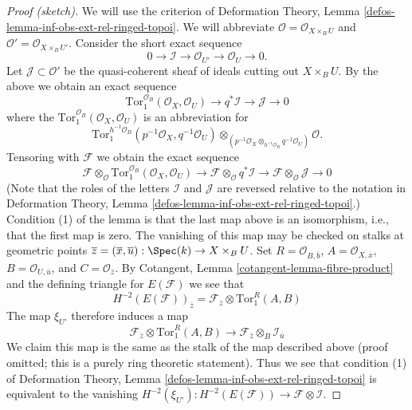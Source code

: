 \begin{proof}[Proof (sketch)]
We will use the criterion of
Deformation Theory, Lemma \ref{defos-lemma-inf-obs-ext-rel-ringed-topoi}.
We will abbreviate $\mathcal{O} = \mathcal{O}_{X \times_B U}$ and
$\mathcal{O}' = \mathcal{O}_{X \times_B U'}$.
Consider the short exact sequence
$$
0 \to \mathcal{I} \to \mathcal{O}_{U'} \to \mathcal{O}_U \to 0.
$$
Let $\mathcal{J} \subset \mathcal{O}'$ be the quasi-coherent
sheaf of ideals cutting out $X \times_B U$. By the above we obtain an exact
sequence
$$
\text{Tor}_1^{\mathcal{O}_B}(\mathcal{O}_X, \mathcal{O}_U) \to
q^*\mathcal{I} \to \mathcal{J} \to 0
$$
where the $\text{Tor}_1^{\mathcal{O}_B}(\mathcal{O}_X, \mathcal{O}_U)$
is an abbreviation for
$$
\text{Tor}_1^{h^{-1}\mathcal{O}_B}(p^{-1}\mathcal{O}_X, q^{-1}\mathcal{O}_U)
\otimes_{(p^{-1}\mathcal{O}_X\otimes_{h^{-1}\mathcal{O}_B}q^{-1}\mathcal{O}_U)}
\mathcal{O}.
$$
Tensoring with $\mathcal{F}$ we obtain the exact sequence
$$
\mathcal{F} \otimes_\mathcal{O}
\text{Tor}_1^{\mathcal{O}_B}(\mathcal{O}_X, \mathcal{O}_U) \to
\mathcal{F} \otimes_\mathcal{O}
q^*\mathcal{I} \to
\mathcal{F} \otimes_\mathcal{O} \mathcal{J} \to 0
$$
(Note that the roles of the letters $\mathcal{I}$ and $\mathcal{J}$
are reversed relative to the notation in
Deformation Theory, Lemma \ref{defos-lemma-inf-obs-ext-rel-ringed-topoi}.)
Condition (1) of the lemma is that the last map above is an
isomorphism, i.e., that the first map is zero.
The vanishing of this map may be checked on stalks at geometric points 
$\overline{z} = (\overline{x}, \overline{u}) : \Spec(k) \to X \times_B U$.
Set $R = \mathcal{O}_{B, \overline{b}}$, $A = \mathcal{O}_{X, \overline{x}}$,
$B = \mathcal{O}_{U, \overline{u}}$, and
$C = \mathcal{O}_{\overline{z}}$.
By Cotangent, Lemma \ref{cotangent-lemma-fibre-product}
and the defining triangle for $E(\mathcal{F})$ we see that
$$
H^{-2}(E(\mathcal{F}))_{\overline{z}} =
\mathcal{F}_{\overline{z}} \otimes \text{Tor}_1^R(A, B)
$$
The map $\xi_{U'}$ therefore induces a map
$$
\mathcal{F}_{\overline{z}} \otimes \text{Tor}_1^R(A, B)
\longrightarrow
\mathcal{F}_{\overline{z}} \otimes_B \mathcal{I}_{\overline{u}}
$$
We claim this map is the same as the stalk of the map described above
(proof omitted; this is a purely ring theoretic statement).
Thus we see that condition (1) of 
Deformation Theory, Lemma \ref{defos-lemma-inf-obs-ext-rel-ringed-topoi}
is equivalent to the vanishing
$H^{-2}(\xi_{U'}) :
H^{-2}(E(\mathcal{F})) \to \mathcal{F} \otimes \mathcal{I}$.


\end{proof}
